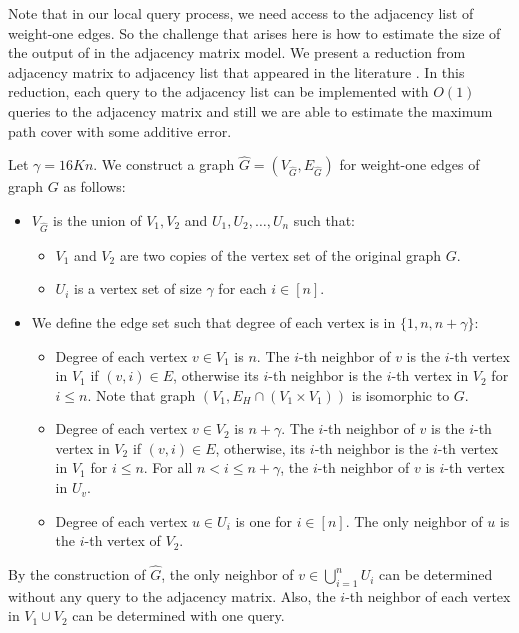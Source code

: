 Note that in our local query process, we need access to the adjacency list of weight-one edges. So the challenge that arises here is how to estimate the size of the output of \algtwo{} in the adjacency matrix model. We present a reduction from adjacency matrix to adjacency list that appeared in the literature \cite{behnezhad2021}. In this reduction, each query to the adjacency list can be implemented with $O(1)$ queries to the adjacency matrix and still we are able to estimate the maximum path cover with some additive error.


Let $\gamma = 16Kn$. We construct a graph $\hat{G} = (V_{\hat{G}}, E_{\hat{G}})$ for weight-one edges of graph $G$ as follows:

\begin{itemize}
    \item $V_{\hat{G}}$ is the union of $V_1, V_2$ and $U_1, U_2, \ldots, U_n$ such that:
    \begin{itemize}
        \item $V_1$ and $V_2$ are two copies of the vertex set of the original graph $G$.
        \item $U_i$ is a vertex set of size $\gamma$ for each $i \in [n]$.
    \end{itemize}
    \item We define the edge set such that degree of each vertex is in $\{1, n, n + \gamma \}$:
    \begin{itemize}
        \item Degree of each vertex $v \in V_1$ is $n$. The $i$-th neighbor of $v$ is the $i$-th vertex in $V_1$ if $(v, i) \in E$, otherwise its $i$-th neighbor is the $i$-th vertex in $V_2$ for $i \leq n$. Note that graph $(V_1, E_H \cap (V_1 \times V_1))$ is isomorphic to $G$.
        \item Degree of each vertex $v \in V_2$ is $n + \gamma$. The $i$-th neighbor of $v$ is the $i$-th vertex in $V_2$ if $(v, i) \in E$, otherwise, its $i$-th neighbor is the $i$-th vertex in $V_1$ for $i \leq n$. For all $n < i \leq n + \gamma$, the $i$-th neighbor of $v$ is $i$-th vertex in $U_v$.
        \item Degree of each vertex $u \in U_i$ is one for $i \in [n]$. The only neighbor of $u$ is the $i$-th vertex of $V_2$.
    \end{itemize}
\end{itemize}

By the construction of $\hat{G}$, the only neighbor of $v \in \bigcup_{i=1}^n U_i$ can be determined without any query to the adjacency matrix. Also, the $i$-th neighbor of each vertex in $V_1 \cup V_2$ can be determined with one query.

